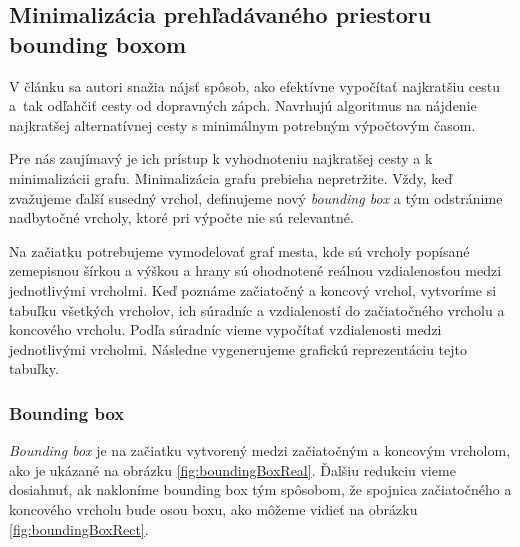 \subsection{Minimalizácia prehľadávaného priestoru bounding boxom}
V článku \cite{alternate} sa autori snažia nájsť spôsob, ako efektívne vypočítať najkratšiu cestu a~tak odľahčiť cesty od dopravných zápch. Navrhujú algoritmus na nájdenie najkratšej alternatívnej cesty s minimálnym potrebným výpočtovým časom. 

Pre nás zaujímavý je ich prístup k vyhodnoteniu najkratšej cesty a k minimalizácii grafu. Minimalizácia grafu prebieha nepretržite. Vždy, keď zvažujeme ďalší susedný vrchol, definujeme nový \textit{bounding box} a tým odstránime nadbytočné vrcholy, ktoré pri výpočte nie sú relevantné.

Na začiatku potrebujeme vymodelovať graf mesta, kde sú vrcholy popísané zemepisnou šírkou a výškou a hrany sú ohodnotené reálnou vzdialenosťou medzi jednotlivými vrcholmi. Keď poznáme začiatočný a koncový vrchol, vytvoríme si tabuľku všetkých vrcholov, ich súradníc a vzdialeností do začiatočného vrcholu a koncového vrcholu. Podľa súradníc vieme vypočítať vzdialenosti medzi jednotlivými vrcholmi. Následne vygenerujeme grafickú reprezentáciu tejto tabuľky. 

\subsubsection{Bounding box}
\textit{Bounding box} je na začiatku vytvorený medzi začiatočným a koncovým vrcholom, ako je ukázané na obrázku \ref{fig:boundingBoxReal}. Ďalšiu redukciu vieme dosiahnuť, ak nakloníme bounding box tým spôsobom, že spojnica začiatočného a koncového vrcholu bude osou boxu, ako môžeme vidieť na obrázku \ref{fig:boundingBoxRect}. 

